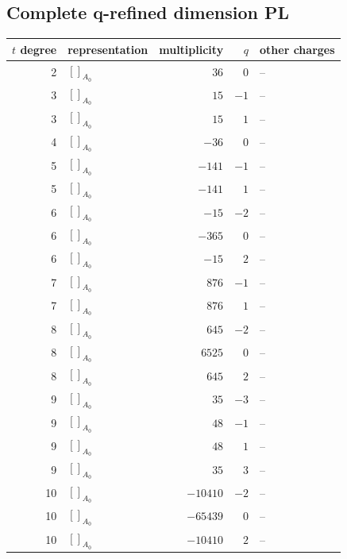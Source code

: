\documentclass[11pt]{article}
\newcommand{\Dynkin}[1]{#1}
\begin{document}
\subsection{Complete q-refined dimension PL}
\begin{longtable}{r l r r l}
\toprule $t$ degree & representation & multiplicity & $q$ & other charges\\\midrule\endhead
2 & $\Dynkin{[]_{A_0}}$ & $36$ & $0$ & --\\
3 & $\Dynkin{[]_{A_0}}$ & $15$ & $-1$ & --\\
3 & $\Dynkin{[]_{A_0}}$ & $15$ & $1$ & --\\
4 & $\Dynkin{[]_{A_0}}$ & $-36$ & $0$ & --\\
5 & $\Dynkin{[]_{A_0}}$ & $-141$ & $-1$ & --\\
5 & $\Dynkin{[]_{A_0}}$ & $-141$ & $1$ & --\\
6 & $\Dynkin{[]_{A_0}}$ & $-15$ & $-2$ & --\\
6 & $\Dynkin{[]_{A_0}}$ & $-365$ & $0$ & --\\
6 & $\Dynkin{[]_{A_0}}$ & $-15$ & $2$ & --\\
7 & $\Dynkin{[]_{A_0}}$ & $876$ & $-1$ & --\\
7 & $\Dynkin{[]_{A_0}}$ & $876$ & $1$ & --\\
8 & $\Dynkin{[]_{A_0}}$ & $645$ & $-2$ & --\\
8 & $\Dynkin{[]_{A_0}}$ & $6525$ & $0$ & --\\
8 & $\Dynkin{[]_{A_0}}$ & $645$ & $2$ & --\\
9 & $\Dynkin{[]_{A_0}}$ & $35$ & $-3$ & --\\
9 & $\Dynkin{[]_{A_0}}$ & $48$ & $-1$ & --\\
9 & $\Dynkin{[]_{A_0}}$ & $48$ & $1$ & --\\
9 & $\Dynkin{[]_{A_0}}$ & $35$ & $3$ & --\\
10 & $\Dynkin{[]_{A_0}}$ & $-10410$ & $-2$ & --\\
10 & $\Dynkin{[]_{A_0}}$ & $-65439$ & $0$ & --\\
10 & $\Dynkin{[]_{A_0}}$ & $-10410$ & $2$ & --\\
\bottomrule\end{longtable}
\end{document}
